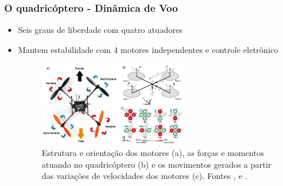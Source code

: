 \documentclass{beamer}
\begin{document}
\begin{frame}[allowframebreaks]
	
	\frametitle{O quadricóptero - Dinâmica de Voo}
	
	\begin{itemize}
		
		\item Seis graus de liberdade com quatro atuadores
		
		\vspace{2cm}
		
		\item Mantem estabilidade com 4 motores independentes e controle eletrônico
		
	\framebreak	
		
		\begin{figure}
			\centering
			\includegraphics[keepaspectratio = true,
			width=0.6\textwidth]{img/diagrama_quadricoptero.png}
			\caption{Estrutura e orientação dos motores (a), as forças e momentos atuando no quadricóptero (b) e os movimentos gerados a partir das variações de velocidades dos motores (c). Fontes \cite{quadblog}, \cite{Mian2008} e \cite{Domingues2009}.}
			\label{fig:diag quad}
		\end{figure}
	
	\end{itemize}	
	
\end{frame}	 
\end{document}

